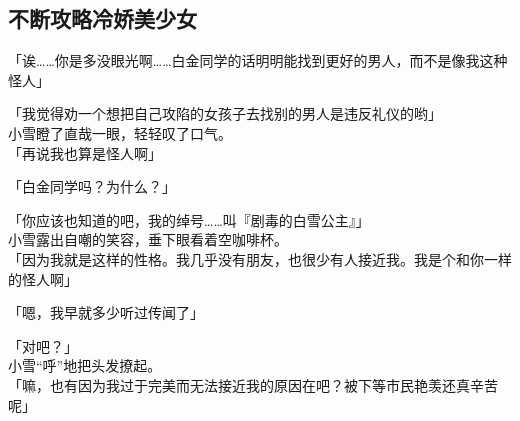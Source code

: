 \subsection{不断攻略冷娇美少女}

「诶……你是多没眼光啊……白金同学的话明明能找到更好的男人，而不是像我这种怪人」

「我觉得劝一个想把自己攻陷的女孩子去找别的男人是违反礼仪的哟」\\

小雪瞪了直哉一眼，轻轻叹了口气。\\

「再说我也算是怪人啊」

「白金同学吗？为什么？」

「你应该也知道的吧，我的绰号……叫『剧毒的白雪公主』」\\

小雪露出自嘲的笑容，垂下眼看着空咖啡杯。\\

「因为我就是这样的性格。我几乎没有朋友，也很少有人接近我。我是个和你一样的怪人啊」

「嗯，我早就多少听过传闻了」

「对吧？」\\

小雪“呼”地把头发撩起。\\

「嘛，也有因为我过于完美而无法接近我的原因在吧？被下等市民艳羡还真辛苦呢」

